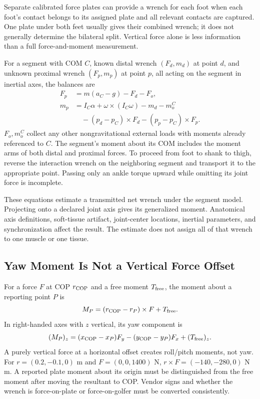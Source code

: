 Separate calibrated force plates can provide a wrench for each foot when each
foot's contact belongs to its assigned plate and all relevant contacts are
captured. One plate under both feet usually gives their combined wrench; it
does not generally determine the bilateral split. Vertical force alone is less
information than a full force-and-moment measurement.

For a segment with COM $C$, known distal wrench $(F_d,m_d)$ at point $d$, and
unknown proximal wrench $(F_p,m_p)$ at point $p$, all acting on the segment in
inertial axes, the balances are
\begin{equation}
 \begin{aligned}
 F_p&=m(a_C-g)-F_d-F_o,\\
 m_p&=I_C\alpha+\omega\times(I_C\omega)-m_d-m_o^C\\
    &\hspace{1em}-(p_d-p_C)\times F_d-(p_p-p_C)\times F_p.
 \end{aligned}
 \label{eq:distal_proximal_balance}
\end{equation}
$F_o,m_o^C$ collect any other nongravitational external loads with moments
already referenced to $C$. The segment's moment about its COM includes the
moment arms of both distal and proximal forces. To proceed from foot to shank
to thigh, reverse the interaction wrench on the neighboring segment and
transport it to the appropriate point. Passing only an ankle torque upward
while omitting its joint force is incomplete.

These equations estimate a transmitted net wrench under the segment model.
Projecting onto a declared joint axis gives its generalized moment. Anatomical
axis definitions, soft-tissue artifact, joint-center locations, inertial
parameters, and synchronization affect the result. The estimate does not assign
all of that wrench to one muscle or one tissue.

\subsection{Yaw Moment Is Not a Vertical Force Offset}
\label{sec:ground_torque_detailed}

For a force $F$ at COP $r_{\rm COP}$ and a free moment $T_{\rm free}$,
the moment about a reporting point $P$ is
\begin{equation}
 M_P=(r_{\rm COP}-r_P)\times F+T_{\rm free}.
 \label{eq:ground_torque_offset}
\end{equation}
In right-handed axes with $z$ vertical, its yaw component is
\begin{equation}
 (M_P)_z=(x_{\rm COP}-x_P)F_y
 -(y_{\rm COP}-y_P)F_x+(T_{\rm free})_z.
 \label{eq:ground_torque_cop}
\end{equation}
A purely vertical force at a horizontal offset creates roll/pitch moments,
not yaw. For $r=(0.2,-0.1,0)$ m and $F=(0,0,1400)$ N,
$r\times F=(-140,-280,0)$ N m. A reported plate moment about its origin
must be distinguished from the free moment after moving the resultant to COP.
Vendor signs and whether the wrench is force-on-plate or force-on-golfer must
be converted consistently.

